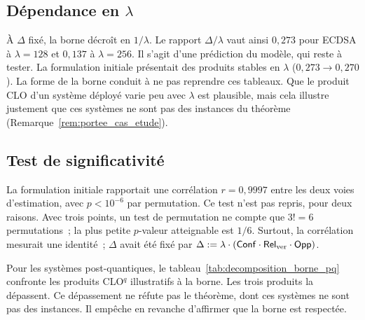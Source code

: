\subsection{D\'ependance en $\lambda$}
\label{sec:stabilite_lambda}
\begin{sloppypar}
\label{subsec:stabilite_classiques}\label{subsec:stabilite_quantiques}

\`A $\Delta$ fix\'e, la borne d\'ecro\^it en $1/\lambda$. Le rapport $\Delta/\lambda$
vaut ainsi $0{,}273$ pour ECDSA \`a $\lambda = 128$ et $0{,}137$ \`a $\lambda = 256$. Il s'agit
d'une pr\'ediction du mod\`ele, qui reste \`a tester. La formulation initiale
pr\'esentait des produits \og stables\fg{} en $\lambda$ ($0{,}273 \to 0{,}270$). La
forme de la borne conduit \`a ne pas reprendre ces tableaux. Que le produit CLO d'un
syst\`eme d\'eploy\'e varie peu avec $\lambda$ est plausible, mais cela illustre
justement que ces syst\`emes ne sont pas des instances du th\'eor\`eme
(Remarque~\ref{rem:portee_cas_etude}).
\end{sloppypar}

\subsection{Test de significativit\'e}
\label{sec:test_significativite}
\begin{sloppypar}
\label{subsec:test_classiques}\label{subsec:test_quantiques}

La formulation initiale rapportait une corr\'elation $r = 0{,}9997$ entre les deux
voies d'estimation, avec $p < 10^{-6}$ par permutation. Ce test n'est pas repris,
pour deux raisons. Avec trois points, un test de permutation ne compte que $3! = 6$
permutations~; la plus petite $p$-valeur atteignable est $1/6$. Surtout, la
corr\'elation mesurait une identit\'e~; $\Delta$ avait \'et\'e fix\'e par
$\Delta := \lambda \cdot (\mathsf{Conf} \cdot \mathsf{Rel}_{\mathrm{ver}} \cdot \mathsf{Opp})$.

Pour les syst\`emes post-quantiques, le tableau~\ref{tab:decomposition_borne_pq} confronte
les produits CLO$^q$ illustratifs \`a la borne. Les trois produits la d\'epassent. Ce d\'epassement ne r\'efute pas le
th\'eor\`eme, dont ces syst\`emes ne sont pas des instances. Il emp\^eche en
revanche d'affirmer que la borne est \og respect\'ee\fg.
\end{sloppypar}

